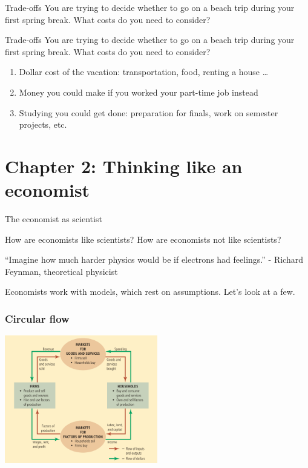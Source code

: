 \documentclass[aspectratio=169]{beamer}
\begin{document}
\begin{frame}{Trade-offs}
    You are trying to decide whether to go on a beach trip during your first spring break. What costs do you need to consider? 
\end{frame}

\begin{frame}{Trade-offs}
    You are trying to decide whether to go on a beach trip during your first spring break. What costs do you need to consider? 

    \medskip

    \begin{enumerate}
        \item Dollar cost of the vacation: transportation, food, renting a house \dots
        \item Money you could make if you worked your part-time job instead
        \item Studying you could get done: preparation for finals, work on semester projects, etc.
    \end{enumerate}
\end{frame}

\section{Chapter 2: Thinking like an economist}

\begin{frame}{The economist as scientist}

    \medskip

    How are economists like scientists? 
    How are economists not like scientists?

    \medskip

    \begin{block}{“Imagine how much harder physics would be if electrons had feelings.”}
        - Richard Feynman, theoretical physicist
    \end{block}

    \medskip

    Economists work with models, which rest on assumptions. Let's look at a few.
\end{frame}

\begin{frame}
    \frametitle{Circular flow}
    \centering
    \includegraphics[width = 0.5\textwidth,keepaspectratio]{model1.png}
\end{frame}
\end{document}
